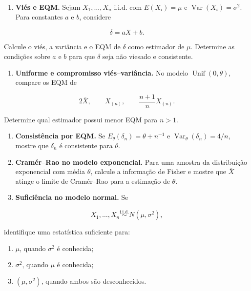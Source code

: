 \documentclass[
  letterpaper,
  DIV=11,
  numbers=noendperiod]{scrreprt}
\providecommand{\tightlist}{%
  \setlength{\itemsep}{0pt}\setlength{\parskip}{0pt}}\usepackage{longtable,booktabs,array}
\begin{document}
\begin{enumerate}
\def\labelenumi{\arabic{enumi}.}
\tightlist
\item
  \textbf{Viés e EQM.} Sejam \(X_1,\ldots,X_n\) i.i.d. com
  \(E(X_i)=\mu\) e \(\operatorname{Var}(X_i)=\sigma^2\). Para constantes
  \(a\) e \(b\), considere
\end{enumerate}

\[\delta=a\overline{X}+b.\]

Calcule o viés, a variância e o EQM de \(\delta\) como estimador de
\(\mu\). Determine as condições sobre \(a\) e \(b\) para que \(\delta\)
seja não viesado e consistente.

\begin{enumerate}
\def\labelenumi{\arabic{enumi}.}
\setcounter{enumi}{1}
\tightlist
\item
  \textbf{Uniforme e compromisso viés--variância.} No modelo
  \(\operatorname{Unif}(0,\theta)\), compare os EQM de
\end{enumerate}

\[2\overline{X},
\qquad
X_{(n)},
\qquad
\frac{n+1}{n}X_{(n)}.\]

Determine qual estimador possui menor EQM para \(n>1\).

\begin{enumerate}
\def\labelenumi{\arabic{enumi}.}
\setcounter{enumi}{2}
\item
  \textbf{Consistência por EQM.} Se \(E_\theta(\delta_n)=\theta+n^{-1}\)
  e \(\operatorname{Var}_\theta(\delta_n)=4/n\), mostre que \(\delta_n\)
  é consistente para \(\theta\).
\item
  \textbf{Cramér--Rao no modelo exponencial.} Para uma amostra da
  distribuição exponencial com média \(\theta\), calcule a informação de
  Fisher e mostre que \(\overline{X}\) atinge o limite de Cramér--Rao
  para a estimação de \(\theta\).
\item
  \textbf{Suficiência no modelo normal.} Se
\end{enumerate}

\[X_1,\ldots,X_n
\overset{\mathrm{i.i.d.}}{\sim}
N(\mu,\sigma^2),\]

identifique uma estatística suficiente para:

\begin{enumerate}
\def\labelenumi{\alph{enumi}.}
\item
  \(\mu\), quando \(\sigma^2\) é conhecida;
\item
  \(\sigma^2\), quando \(\mu\) é conhecida;
\item
  \((\mu,\sigma^2)\), quando ambos são desconhecidos.
\end{enumerate}
\end{document}
